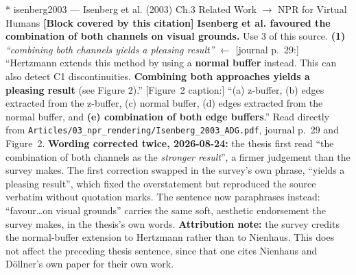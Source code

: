 \documentclass[11pt, a4paper]{article}
\makeatletter
\newcounter{citentry}
\newcommand{\citentry@core}[7]{%
  \stepcounter{citentry}
  \begingroup
  \sbox{\citentry@measurebox}{%
    \begin{minipage}{\linewidth}
      \noindent\colorbox{konstanzblue}{\parbox{\dimexpr\linewidth-2\fboxsep}{%
        \vspace{3pt}
        \textbf{\#\thecitentry \quad #2} \hfill \textit{#3}
        \vspace{3pt}
      }}
      \vspace{3pt}
      \noindent\begin{tabular}{@{}p{2.7cm} p{\dimexpr\linewidth-3cm}@{}}
        \textit{\small Sentence in thesis:} & #4 \\[5pt]
        \textbf{Usage:}\hfill       & #5 \\[5pt]
        \textit{\small Original source:}     & #6 \\[5pt]
        \textbf{How to check:}             & #7 \\
      \end{tabular}
      \vspace{5pt}
      \rule{10pt}{10pt}\quad \textbf{Validated} --- I have read the original and agree it supports the sentence.
    \end{minipage}%
  }%
  \Needspace{\dimexpr\ht\citentry@measurebox+\dp\citentry@measurebox\relax}%
  \endgroup
  \vspace{10pt}
  \noindent\colorbox{konstanzblue}{\parbox{\dimexpr\linewidth-2\fboxsep}{%
    \vspace{3pt}
    \textcolor{white}{\textbf{\#\thecitentry \quad #2}} \hfill \textcolor{white}{\textit{#3}}
    \vspace{3pt}
  }}
  \vspace{3pt}
  \noindent\begin{tabular}{@{}p{2.7cm} p{\dimexpr\linewidth-3cm}@{}}
    \textit{\small Sentence in thesis:} & \textcolor{darkgreen}{#4} \\[5pt]
    \textbf{Usage:}\hfill       & #5 \\[5pt]
    \textit{\small Original source:}     & \textcolor{darkred}{#6} \\[5pt]
    \textbf{How to check:}             & #7 \\
  \end{tabular}
  \vspace{5pt}
  \noindent\CheckBox[name=verified\thecitentry, width=10pt, height=10pt, bordercolor={0 0 0}, borderwidth=0.75, backgroundcolor={1 1 1}#1]{}\quad \textbf{Validated} --- I have read the original and agree it supports the sentence.
  \vspace{3pt}
  \noindent\textcolor{midgray}{\rule{\linewidth}{0.4pt}}
}
\newcommand{\citentry}{\@ifstar{\citentry@core{, checked}}{\citentry@core{}}}
\makeatother
\begin{document}
\begin{Form}
\citentry*
  {isenberg2003 --- Isenberg et al. (2003)}
  {Ch.3 Related Work $\rightarrow$ NPR for Virtual Humans}
  {\textbf{[Block covered by this citation]} \textbf{Isenberg et al. favoured the combination of both channels on visual grounds.}}
  {Use 3 of this source.}
  {\textbf{(1)} \emph{``combining both channels yields a pleasing result''} $\leftarrow$ [journal p.~29:] ``Hertzmann extends this method by using a \textbf{normal buffer} instead. This can also detect C1 discontinuities. \textbf{Combining both approaches yields a pleasing result} (see Figure 2).'' [Figure~2 caption:] ``(a) z-buffer, (b) edges extracted from the z-buffer, (c) normal buffer, (d) edges extracted from the normal buffer, and \textbf{(e) combination of both edge buffers}.''}
  {Read directly from \texttt{\footnotesize Articles/03\_npr\_rendering/Isenberg\_2003\_ADG.pdf}, journal p.~29 and Figure~2. \textbf{Wording corrected twice, 2026-08-24:} the thesis first read ``the combination of both channels as the \emph{stronger result}'', a firmer judgement than the survey makes. The first correction swapped in the survey's own phrase, ``yields a pleasing result'', which fixed the overstatement but reproduced the source verbatim without quotation marks. The sentence now paraphrases instead: ``favour\ldots on visual grounds'' carries the same soft, aesthetic endorsement the survey makes, in the thesis's own words. \textbf{Attribution note:} the survey credits the normal-buffer extension to Hertzmann rather than to Nienhaus. This does not affect the preceding thesis sentence, since that one cites Nienhaus and D\"ollner's own paper for their own work.}


\end{Form}
\end{document}
